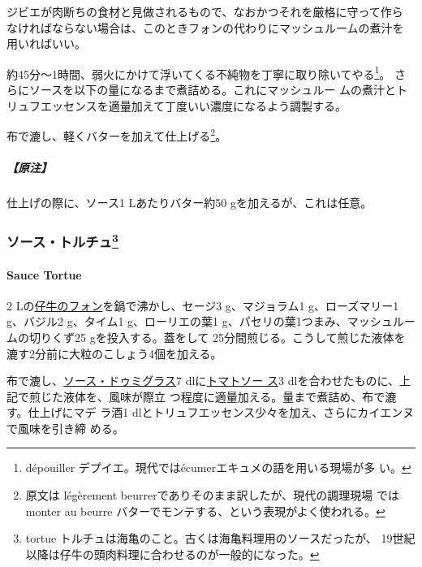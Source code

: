 ジビエが肉断ちの食材と見做されるもので、なおかつそれを厳格に守って作ら
なければならない場合は、このときフォンの代わりにマッシュルームの煮汁を
用いればいい。

約45分〜1時間、弱火にかけて浮いてくる不純物を丁寧に取り除いてやる\footnote{dépouiller
  デプイエ。現代ではécumerエキュメの語を用いる現場が多 い。}。
さらにソースを\deuxtiers{}以下の量になるまで煮詰める。これにマッシュルー
ムの煮汁とトリュフエッセンスを適量加えて丁度いい濃度になるよう調製する。

布で漉し、軽くバターを加えて仕上げる\footnote{原文は légèrement
  beurrerでありそのまま訳したが、現代の調理現場 ではmonter au beurre
  バターでモンテする、という表現がよく使われる。}。

\hypertarget{ux539fux6ce8-9}{%
\subparagraph{【原注】}\label{ux539fux6ce8-9}}

仕上げの際に、ソース1 Lあたりバター約50 gを加えるが、これは任意。

\maeaki

\hypertarget{ux30bdux30fcux30b9ux30c8ux30ebux30c1ux30e593}{%
\subsubsection[ソース・トルチュ]{\texorpdfstring{ソース・トルチュ\footnote{tortue
  トルチュは海亀のこと。古くは海亀料理用のソースだったが、
  19世紀以降は仔牛の頭肉料理に合わせるのが一般的になった。}}{ソース・トルチュ}}\label{ux30bdux30fcux30b9ux30c8ux30ebux30c1ux30e593}}

\hypertarget{sauce-tortue}{%
\paragraph{Sauce Tortue}\label{sauce-tortue}}

  

2\undemi{}
Lの\protect\hyperlink{fonds-de-veau-brun}{仔牛のフォン}を鍋で沸かし、セージ3
g、マジョラム1 g、ローズマリー1 g、バジル2 g、タイム1 g、ローリエの葉1
g、パセリの葉1つまみ、マッシュルームの切りくず25 gを投入する。蓋をして
25分間煎じる。こうして煎じた液体を漉す2分前に大粒のこしょう4個を加える。

布で漉し、\protect\hyperlink{sauce-demi-glace}{ソース・ドゥミグラス}7
dlに\protect\hyperlink{sauce-tomate}{トマトソー ス}3
dlを合わせたものに、上記で煎じた液体を、風味が際立
つ程度に適量加える。\troisquarts{}量まで煮詰め、布で漉す。仕上げにマデ
ラ酒1 dlとトリュフエッセンス少々を加え、さらにカイエンヌで風味を引き締
める。

